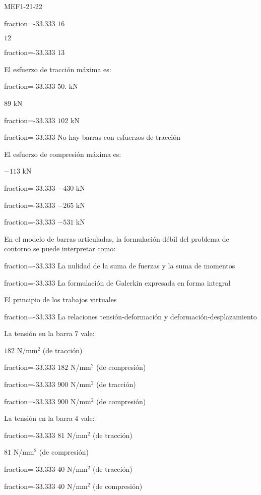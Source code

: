\documentclass[a4paper]{article}
\begin{document}
\begin{quiz}{MEF1-21-22}
\begin{multi}{}
	\item[fraction=-33.333] $16$
	\item* $12$
	\item[fraction=-33.333] $13$
\end{multi}
\begin{multi}{}
El esfuerzo de tracci\'on m\'axima es:
	\item[fraction=-33.333] $50.$ kN
	\item* $89$ kN
	\item[fraction=-33.333] $102$ kN
	\item[fraction=-33.333] No hay barras con esfuerzos de tracci\'on
\end{multi}
\begin{multi}{}
El esfuerzo de compresi\'on m\'axima es:
	\item* $-113$ kN
	\item[fraction=-33.333] $-430$ kN
	\item[fraction=-33.333] $-265$ kN
	\item[fraction=-33.333] $-531$ kN
\end{multi}
\begin{multi}{}
	En el modelo de barras articuladas, la formulaci\'on d\'ebil del problema
	de contorno se puede interpretar como:
	\item[fraction=-33.333] La nulidad de la suma de fuerzas y la suma de momentos
	\item[fraction=-33.333] La formulaci\'on de Galerkin expresada en forma integral
	\item* El principio de los trabajos virtuales
	\item[fraction=-33.333] La relaciones tensi\'on-deformaci\'on y deformaci\'on-desplazamiento
\end{multi}
\begin{multi}{}
	La tensi\'on en la barra $7$ vale:
	\item* $182$ N/mm$^2$ (de tracci\'on)
	\item[fraction=-33.333] $182$ N/mm$^2$ (de compresi\'on)
	\item[fraction=-33.333] $900$ N/mm$^2$ (de tracci\'on)
	\item[fraction=-33.333] $900$ N/mm$^2$ (de compresi\'on)
\end{multi}
\begin{multi}{}
La tensi\'on en la barra $4$ vale:
	\item[fraction=-33.333] $81$ N/mm$^2$ (de tracci\'on)
	\item* $81$ N/mm$^2$ (de compresi\'on)
	\item[fraction=-33.333] $40$ N/mm$^2$ (de tracci\'on)
	\item[fraction=-33.333] $40$ N/mm$^2$ (de compresi\'on)
\end{multi}

\end{quiz}
\end{document}
